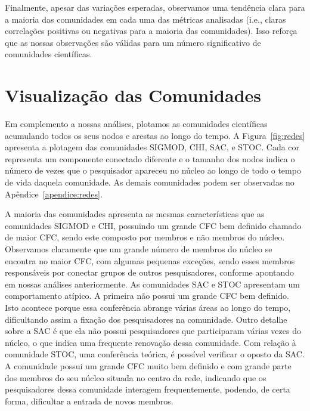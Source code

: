 Finalmente, apesar das variações esperadas, observamos uma tendência clara para a maioria das comunidades em cada uma das 
métricas analisadas (i.e., claras correlações positivas ou negativas para a maioria das comunidades). Isso reforça 
que as nossas observações são válidas para um número significativo de comunidades científicas.



\section{Visualização das Comunidades}

Em complemento a nossas análises, plotamos as comunidades científicas acumulando todos os seus nodos e arestas ao longo 
do tempo. A Figura~\ref{fig:redes} apresenta a plotagem das comunidades SIGMOD, CHI, SAC, e STOC. Cada cor representa um 
componente conectado diferente e o tamanho dos nodos indica o número de vezes que o pesquisador apareceu no núcleo ao 
longo de todo o tempo de vida daquela comunidade. As demais comunidades podem ser observadas no Apêndice~\ref{apendice:redes}. 

A maioria das comunidades apresenta as mesmas características que as comunidades SIGMOD e CHI, possuindo um
grande CFC bem definido chamado de maior CFC, sendo este composto por membros e não membros do núcleo. Observamos 
claramente que um grande número de membros do núcleo se encontra no maior CFC, com algumas pequenas exceções, sendo 
esses membros responsáveis por conectar grupos de outros pesquisadores, conforme apontando em nossas análises anteriormente. 
As comunidades SAC e STOC apresentam um comportamento atípico. A primeira não
possui um grande CFC bem definido. Isto acontece porque essa conferência abrange várias áreas ao longo do tempo, dificultando
assim a fixação dos pesquisadores na comunidade. Outro detalhe sobre a SAC é que ela não possui pesquisadores que participaram 
várias vezes do núcleo, o que indica uma frequente renovação dessa comunidade. Com relação à comunidade STOC, uma conferência 
teórica, é possível verificar o oposto da SAC. A comunidade possui um grande CFC muito bem definido e com grande 
parte dos membros do seu núcleo situada no centro da rede, indicando que os pesquisadores dessa comunidade interagem frequentemente, 
podendo, de certa forma, dificultar a entrada de novos membros.

